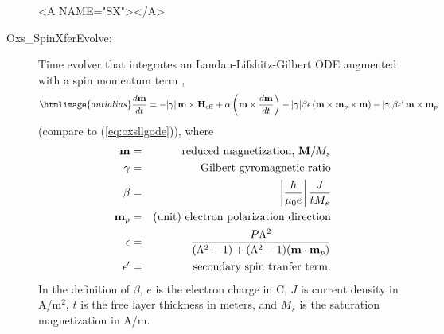 \begin{description}
\begin{rawhtml}<A NAME="SX"></A>\end{rawhtml}%
%
\item[Oxs\_SpinXferEvolve:\label{html:SpinXferEvolve}]
Time evolver that integrates an
Landau-Lifshitz-Gilbert ODE augmented with a
spin momentum term \cite{xiao04},
\begin{equation}
\htmlimage{antialias}
  \frac{d\vm}{dt} = -|\gamma|\,\vm\times\vH_{\rm eff}
   + \alpha
     \left(\vm\times\frac{d\vm}{dt}\right)
   + |\gamma|\beta\epsilon
     \left(\vm\times\vm_p\times\vm\right)
   - |\gamma|\beta\epsilon^\prime\,\vm\times\vm_p
\label{eq:oxsllgspinxfer}
\end{equation}
(compare to (\ref{eq:oxsllgode})), where
\begin{eqnarray*}
\textbf{m} & = & \mbox{reduced magnetization, $\textbf{M}/M_s$} \\
\gamma & = & \mbox{Gilbert gyromagnetic ratio} \\
\beta & = & \left|\frac{\hbar}{\mu_0 e}\right|\frac{J}{t M_s} \\
\textbf{m}_p & = & \mbox{(unit) electron polarization direction} \\
\epsilon & = &
\frac{P\Lambda^2}{(\Lambda^2+1)+(\Lambda^2-1)(\textbf{m}\cdot\textbf{m}_p)} \\
\epsilon^\prime & = & \mbox{secondary spin tranfer term}.
\end{eqnarray*}
In the definition of $\beta$, $e$ is the electron charge in C, $J$ is
current density in A/m${}^2$, $t$ is the free layer thickness in meters,
and $M_s$ is the saturation magnetization in A/m.


\end{description}
